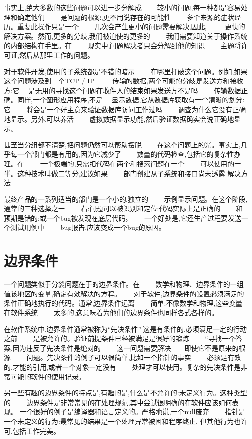 事实上,绝大多数的这些问题可以进一步分解成　　
较小的问题,每一种都是容易处理和确定他们　　
是问题的根源,更不用说存在的可能性　　
多个来源的症状经历。重复此操作只是一个　　
几次会产生更小的问题需要解决,因此, 　　
更快的解决方案。然而,更多的分歧,我们被迫使的更多的　　
我们需要知道关于操作系统的内部结构在手里。在　　
现实中,问题解决者只会分解到他的知识　　
主题将许可证,然后从那里工作的问题。

对于软件开发,使用的子系统都是不错的暗示　　
在哪里打破这个问题。例如,如果这个问题涉及到一个TCP / IP 　　
传输的数据,两个可能的分歧是发送方和接收方:它　
是无用的寻找这个问题在收件人的结束如果发送方不是吗　　
传输数据正确。同样,一个图形应用程序,不是　
显示数据,它从数据库获取有一个清晰的划分:它　　
将会是一个好主意来验证数据库访问工作过吗　　
调查为什么它没有正确地显示。另外,可以养活　　
虚拟数据显示功能,然后验证数据确实会说正确地显示。

甚至当分组都不清楚,把问题仍然可以帮助摆脱　　
在这个问题上的光。事实上,几乎每一个部门都是有用的,因为它减少了　　
数量的代码检查,包括它的复杂性办理。在　　
一个极端的,只需把代码在两个和搜索问题在一个　　
可以使用的一半。这种技术叫做二等分,建议如果　　
部门创建从子系统和接口尚未透露
解决方法 

最终产品的一系列适当的部门是一个小的,独立的　　
示例显示问题。在这个阶段,通常的三种选择之一　　
右:问题可以被识别和定位;代码实际上是正确的　　
和预期是错的;或一个bug被发现在底层代码。　　
一个好处是,它还生产过程要发送一个测试用例中　　
bug报告,应该变成一个bug的原因。

\section*{边界条件}

一个问题类似于分裂问题在于的边界条件。在　　
数学和物理、边界条件的一组值该地区的变量,确定有效解决的方程。　　
对于软件,边界条件的设置必须满足的条件正确地执行的代码。通常,边界条件远离　　
简单:不像数学和物理,这些变量在软件系统　　
太多的,这意味着为他们的边界条件也同样各式各样的。

在软件系统中,边界条件通常被称为“先决条件”,这是有条件的,必须满足一定的行动之前　　
是被允许的。验证前提条件已经被满足是很好的锻炼　　
“寻找一个答案,因为违反了先决条件是绝对的　　
这一问题需要解决——即使它不是原来的根源　　
问题。先决条件的例子可以很简单,比如一个指针的事实　　
必须是有效的,才能的引用,或者一个对象一定没有　　
处理才可以使用。复杂的先决条件是非常可能的软件的使用记录。

另一些有趣的边界条件的特点是,有趣的是,什么是不允许的:未定义行为。这种类型的　　
边界条件是非常常见的在处理规范,其中尝试很明确的在软件应该如何表现。
一个很好的例子是编译器和语言定义的。严格地说,一个null废弃　　
指针是一个未定义的行为:最常见的结果是一个处理异常被困和程序终止,
但其他行为也许可,包括工作完美。

